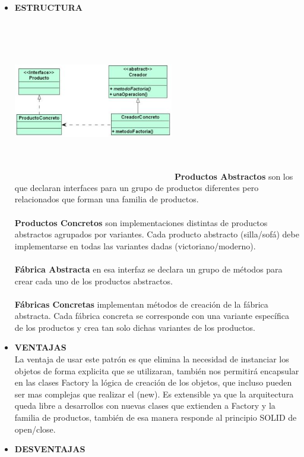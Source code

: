 \documentclass[twoside,twocolumn]{article}
\begin{document}
\begin{itemize}

\item  \textbf{ESTRUCTURA}  

\includegraphics[width=7cm, height=7cm]{imagenes/Factoryp.png}
\textbf{Productos Abstractos}
son los que declaran interfaces para un grupo de productos diferentes pero relacionados que forman una familia de productos.
\\
\\\textbf{Productos Concretos}
son implementaciones distintas de productos abstractos agrupados por variantes. Cada producto abstracto (silla/sofá) debe implementarse en todas las variantes dadas (victoriano/moderno).
\\
\\\textbf{Fábrica Abstracta }
en esa interfaz se declara un grupo de métodos para crear cada uno de los productos abstractos.
\\
\\\textbf{Fábricas Concretas}
implementan métodos de creación de la fábrica abstracta. Cada fábrica concreta se corresponde con una variante específica de los productos y crea tan solo dichas variantes de los productos.
\\\item  \textbf{VENTAJAS}
\\ La ventaja de usar este patrón es que elimina la necesidad de instanciar los objetos de forma explicita que se utilizaran, también nos permitirá encapsular en las clases Factory la lógica de creación de los objetos, que incluso pueden ser mas complejas que realizar el (new).
Es extensible ya que la arquitectura queda libre a desarrollos con nuevas clases que extienden a Factory y la familia de productos, también de esa manera responde al principio SOLID de open/close.
\\\item  \textbf{DESVENTAJAS}

\end{itemize}
\end{document}
